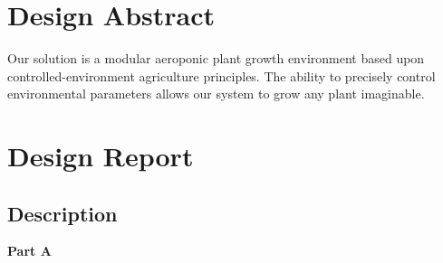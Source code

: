 \documentclass{report}
\begin{document}
\tableofcontents
\newpage

\section{Design Abstract}
Our solution is a modular aeroponic plant growth environment based upon controlled-environment agriculture principles.
The ability to precisely control environmental parameters allows our system to grow any plant imaginable.

\section{Design Report}

\subsection{Description}

\textbf{Part A}





\end{document}
